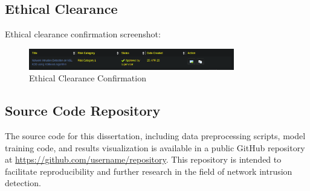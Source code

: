 \subsection{Ethical Clearance}
Ethical clearance confirmation screenshot:
\begin{figure}[H]
	\centering
	\includegraphics[width=0.8\textwidth]{assets/figures/ethics.png}
	\caption{Ethical Clearance Confirmation}
	\label{fig:ethical_clearance}
\end{figure}

\subsection{Source Code Repository}
The source code for this dissertation, including data preprocessing scripts, model training code, and results visualization
 is available in a public GitHub repository at \url{https://github.com/username/repository}. This repository is intended to 
 facilitate reproducibility and further research in the field of network intrusion detection.